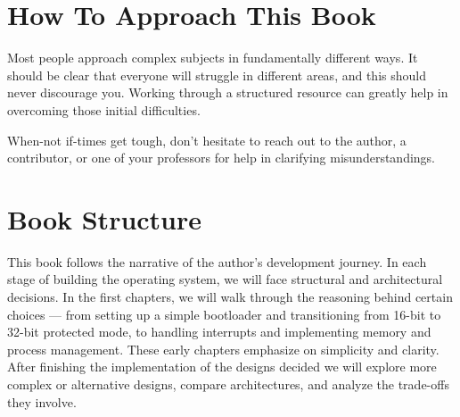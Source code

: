 \section{How To Approach This Book}

Most people approach complex subjects in fundamentally different ways. It should be clear that everyone 
will struggle in different areas, and this should never discourage you. Working through a structured 
resource can greatly help in overcoming those initial difficulties.

When-not if-times get tough, don't hesitate to reach out to the author, a contributor, or one of your professors 
for help in clarifying misunderstandings.

\section{Book Structure}

This book follows the narrative of the author's development journey. In each stage of building the operating 
system, we will face structural and architectural decisions. In the first chapters, we will walk through 
the reasoning behind certain choices — from setting up a simple bootloader and transitioning from 16-bit to 
32-bit protected mode, to handling interrupts and implementing memory and process management. These early 
chapters emphasize on simplicity and clarity. After finishing the implementation of the designs decided we 
will explore more complex or alternative designs, compare architectures, and analyze the trade-offs they involve.